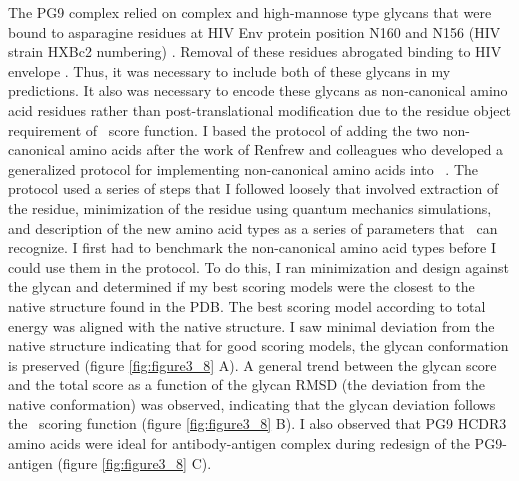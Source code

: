 The PG9 complex relied on complex and high-mannose type glycans that were bound to asparagine residues at HIV Env protein position N160 and N156 (HIV strain HXBc2 numbering) \citep{McLellan:2011dg}. Removal of these residues abrogated binding to HIV envelope \citep{Doores:2010gn}. Thus, it was necessary to include both of these glycans in my predictions. It also was necessary to encode these glycans as non-canonical amino acid residues rather than post-translational modification due to the residue object requirement of \rosetta~score function. I based the protocol of adding the two non-canonical amino acids after the work of Renfrew and colleagues who developed a generalized protocol for implementing non-canonical amino acids into \rosetta~\citep{Renfrew:2012ci}. The protocol used a series of steps that I followed loosely that involved extraction of the residue, minimization of the residue using quantum mechanics simulations, and description of the new amino acid types as a series of parameters that \rosetta~can recognize. I first had to benchmark the non-canonical amino acid types before I could use them in the protocol. To do this, I ran minimization and design against the glycan and determined if my best scoring models were the closest to the native structure found in the PDB. The best scoring model according to total energy was aligned with the native structure. I saw minimal deviation from the native structure indicating that for good scoring models, the glycan conformation is preserved (figure \ref{fig:figure3_8} A). A general trend between the glycan score and the total score as a function of the glycan RMSD (the deviation from the native conformation) was observed, indicating that the glycan deviation follows the \rosetta~scoring function (figure \ref{fig:figure3_8} B). I also observed that PG9 HCDR3 amino acids were ideal for antibody-antigen complex during redesign of the PG9-antigen (figure \ref{fig:figure3_8} C).

